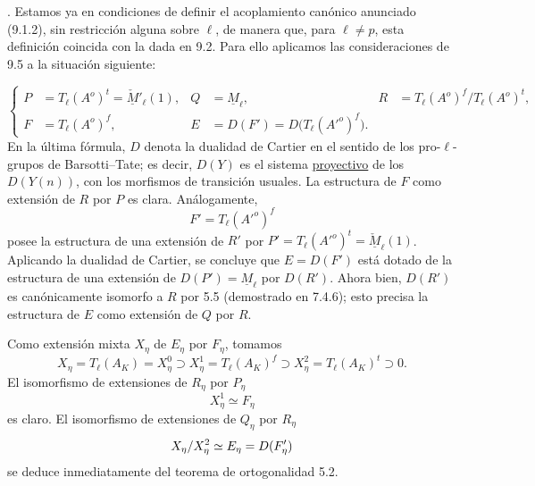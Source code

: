 
\medskip
{}. Estamos ya en condiciones de definir el acoplamiento canónico
anunciado (9.1.2), sin restricción alguna sobre $\ell$, de manera que,
para $\ell\neq p$, esta definición coincida con la dada en 9.2. Para
ello aplicamos las consideraciones de 9.5 a la situación siguiente:

\begin{equation}\tag{9.6.1}
\left\{
\begin{aligned}
P&=T_\ell(A^o)^t=\check{\underline M}{}'_\ell(1),
& Q&=\underline M_\ell,
& R&=T_\ell(A^o)^f/T_\ell(A^o)^t,\\[1.25ex]
F&=T_\ell(A^o)^f,
& E&=D(F')=D\bigl(T_\ell({A'}^o)^f\bigr).
\end{aligned}
\right.
\end{equation}
En la última fórmula, $D$ denota la dualidad de Cartier en el sentido
de los pro-$\ell$-grupos de Barsotti--Tate; es decir, $D(Y)$ es el
sistema \underline{proyectivo} de los $D(Y(n))$, con los morfismos de
transición usuales. La estructura de $F$ como extensión de $R$ por
$P$ es clara. Análogamente,
\begin{equation*}
F'=T_\ell({A'}^o)^f
\end{equation*}
posee la estructura de una extensión de $R'$ por
$P'=T_\ell({A'}^o)^t=\check{\underline M}_\ell(1)$. Aplicando la
dualidad de Cartier, se concluye que $E=D(F')$ está dotado de la
estructura de una extensión de $D(P')=\underline M_\ell$ por $D(R')$.
Ahora bien, $D(R')$ es canónicamente isomorfo a $R$ por 5.5
(demostrado en 7.4.6); esto precisa la estructura de $E$ como extensión
de $Q$ por $R$.


Como extensión mixta $X_\eta$ de $E_\eta$ por $F_\eta$, tomamos
\begin{equation}\tag{9.6.2}
X_\eta=T_\ell(A_K)=X^0_\eta
 \supset X^1_\eta=T_\ell(A_K)^f
 \supset X^2_\eta=T_\ell(A_K)^t
 \supset0.
\end{equation}
El isomorfismo de extensiones de $R_\eta$ por $P_\eta$
\begin{equation*}
X^1_\eta\simeq F_\eta
\end{equation*}
es claro. El isomorfismo de extensiones de $Q_\eta$ por $R_\eta$
\begin{equation*}
X_\eta/X^2_\eta\simeq\sisi{F_\eta}{E_\eta}=D(F'_\eta)
\end{equation*}
se deduce inmediatamente del teorema de ortogonalidad 5.2.

